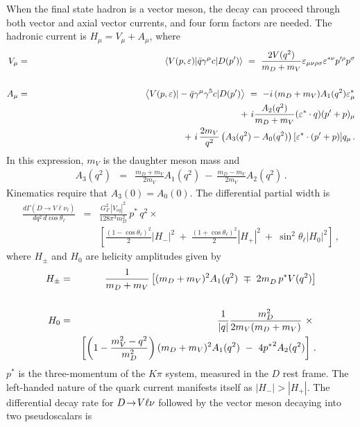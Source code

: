 When the final state hadron is a vector meson, the decay can proceed through
both vector and axial vector currents, and four form factors are needed.
The hadronic current is $H^{}_\mu = V^{}_\mu + A^{}_\mu$, 
where~\cite{Gilman:1989uy} 
\begin{eqnarray}
V_\mu & = & \left< V(p,\varepsilon) | \bar{q}\gamma^\mu c | D(p') \right> \ =\  
\frac{2V(q^2)}{m_D+m_V} 
\varepsilon_{\mu\nu\rho\sigma}\varepsilon^{*\nu}p^{\prime\rho}p^\sigma \\
 & & \nonumber\\
A_\mu & = & \left< V(p,\varepsilon) | -\bar{q}\gamma^\mu\gamma^5 c | D(p') \right> 
 \ =\  -i\,(m_D+m_V)A_1(q^2)\varepsilon^*_\mu \nonumber \\
 & & \hskip2.10in 
  +\ i \frac{A_2(q^2)}{m_D+m_V}(\varepsilon^*\cdot q)(p' + p)_\mu \nonumber \\
 & & \hskip2.30in 
+\ i\,\frac{2m_V}{q^2}\left(A_3(q^2)-A_0(q^2)\right)[\varepsilon^*\cdot (p' + p)] q_\mu\,.
\end{eqnarray}
In this expression, $m_V$ is the daughter meson mass and
\begin{eqnarray}A_3(q^2) & = & \frac{m_D + m_V}{2m_V}A_1(q^2)\ -\ \frac{m_D - m_V}{2m_V}A_2(q^2)\,.
\end{eqnarray}
Kinematics require that $A_3(0) = A_0(0)$.
The differential partial width is
\begin{eqnarray}
\frac{d\Gamma(D \to V \overline \ell \nu_\ell)}{dq^2\, d\cos\theta_\ell} & = & 
  \frac{G_F^2\,|V_{cq}|^2}{128\pi^3m_D^2}\,p^*\,q^2 \times \nonumber \\
 & &  
\left[\frac{(1-\cos\theta_\ell)^2}{2}|H_-|^2\ +\  
\frac{(1+\cos\theta_\ell)^2}{2}|H_+|^2\ +\ \sin^2\theta_\ell|H_0|^2\right]\,,
\end{eqnarray}
where $H^{}_\pm$ and $H^{}_0$ are helicity amplitudes given by
\begin{eqnarray}
H_\pm & = & \frac{1}{m_D + m_V}\left[(m_D+m_V)^2A_1(q^2)\ \mp\ 
      2m^{}_D\,p^* V(q^2)\right] \\
 & & \nonumber \\
H_0 & = & \frac{1}{|q|}\frac{m_D^2}{2m_V(m_D + m_V)}\ \times\ \nonumber \\
 & & \hskip0.01in \left[
    \left(1- \frac{m_V^2 - q^2}{m_D^2}\right)(m_D + m_V)^2 A_1(q^2) 
    \ -\ 4{p^*}^2 A_2(q^2) \right]\,.
\label{HelDef}
\end{eqnarray}
$p^*$ is the three-momentum of the $K \pi$ system, measured in the $D$ rest frame.
The left-handed nature of the quark current manifests itself as
$|H_-|>|H_+|$. The differential decay rate for $D\!\rightarrow\! V\ell\nu$ 
followed by the vector meson decaying into two pseudoscalars is

